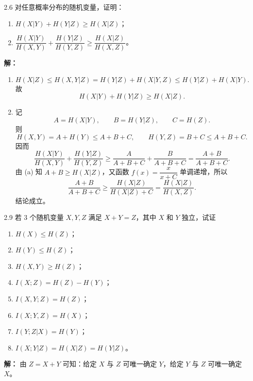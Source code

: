 \documentclass[UTF8,11pt,a4paper]{ctexart}
\begin{document}
\begin{problem}{2.6}
对任意概率分布的随机变量，证明：
\begin{enumerate}[label=\textnormal{(\alph*)}]
  \item $H(X|Y)+H(Y|Z)\ge H(X|Z)$；
  \item $\dfrac{H(X|Y)}{H(X,Y)}+\dfrac{H(Y|Z)}{H(Y,Z)}\ge\dfrac{H(X|Z)}{H(X,Z)}$。
\end{enumerate}
\end{problem}
\noindent\textbf{解：}
\begin{enumerate}[label=\textnormal{(\alph*)}]
  \item
  \[
  H(X|Z)\le H(X,Y|Z)=H(Y|Z)+H(X|Y,Z)\le H(Y|Z)+H(X|Y).
  \]
  故
  \[
  H(X|Y)+H(Y|Z)\ge H(X|Z).
  \]

  \item 记
  \[
  A=H(X|Y),\qquad B=H(Y|Z),\qquad C=H(Z).
  \]
  则
  \[
  H(X,Y)=A+H(Y)\le A+B+C,\qquad H(Y,Z)=B+C\le A+B+C.
  \]
  因而
  \[
  \frac{H(X|Y)}{H(X,Y)}+\frac{H(Y|Z)}{H(Y,Z)}
  \ge
  \frac{A}{A+B+C}+\frac{B}{A+B+C}
  =
  \frac{A+B}{A+B+C}.
  \]
  由 (a) 知 $A+B\ge H(X|Z)$，又函数 $f(x)=\dfrac{x}{x+C}$ 单调递增，所以
  \[
  \frac{A+B}{A+B+C}\ge \frac{H(X|Z)}{H(X|Z)+C}
  =\frac{H(X|Z)}{H(X,Z)}.
  \]
  结论成立。
\end{enumerate}
\vspace{0.8em}

\begin{problem}{2.9}
若 $3$ 个随机变量 $X,Y,Z$ 满足 $X+Y=Z$，其中 $X$ 和 $Y$ 独立，试证
\begin{enumerate}[label=\textnormal{(\alph*)}]
  \item $H(X)\le H(Z)$；
  \item $H(Y)\le H(Z)$；
  \item $H(X,Y)\ge H(Z)$；
  \item $I(X;Z)=H(Z)-H(Y)$；
  \item $I(X,Y;Z)=H(Z)$；
  \item $I(X;Y,Z)=H(X)$；
  \item $I(Y;Z|X)=H(Y)$；
  \item $I(X;Y|Z)=H(X|Z)=H(Y|Z)$。
\end{enumerate}
\end{problem}
\noindent\textbf{解：}
由 $Z=X+Y$ 可知：给定 $X$ 与 $Z$ 可唯一确定 $Y$，给定 $Y$ 与 $Z$ 可唯一确定 $X$。
\end{document}
